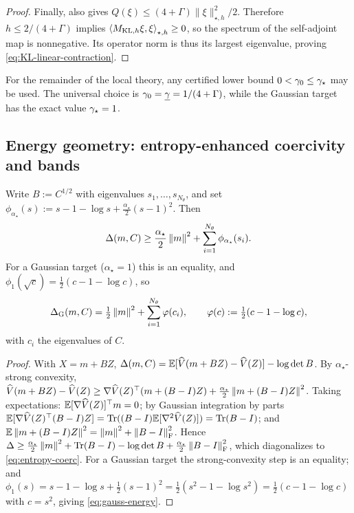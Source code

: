 \begin{proof}
Finally,  also gives
$Q(\xi)\leq(4+\Gamma)\|\xi\|_{\star,h}^2/2$.  Therefore
$h\leq2/(4+\Gamma)$ implies
$\left\langle M_{\mathrm{KL},h}\xi,\xi\right\rangle_{\star,h}\geq0$, so the spectrum of the self-adjoint map is
nonnegative.  Its operator norm is thus its largest eigenvalue, proving
\eqref{eq:KL-linear-contraction}.
\end{proof}

For the remainder of the local theory, any certified lower bound
$0<\gamma_0\leq\gamma_\star$ may be used.  The universal choice is
$\gamma_0=\underline{\gamma}=1/(4+\Gamma)$, while the Gaussian target has the exact value
$\gamma_\star=1$.

\subsection{Energy geometry: entropy-enhanced coercivity and bands}

\begin{lemma}
\label{lem:entropy-coerc}
Write $B:=C^{1/2}$ with eigenvalues $s_1,\dots,s_{N_\theta}$, and set
$\phi_{\alpha_\star}(s):=s-1-\log s+\tfrac{\alpha_\star}2(s-1)^2$. Then
\begin{equation}
\label{eq:entropy-coerc}
    \Delta(m,C)\geq\frac{\alpha_\star}2\left\lVert m\right\rVert^2+\sum_{i=1}^{N_\theta}\phi_{\alpha_\star}(s_i).
\end{equation}
For a Gaussian target ($\alpha_\star=1$) this is an equality, and
$\phi_1(\sqrt c)=\tfrac12(c-1-\log c)$, so
\begin{equation}
\label{eq:gauss-energy}
    \Delta_{\mathrm G}(m,C)=\tfrac12\left\lVert m\right\rVert^2+\sum_{i=1}^{N_\theta}\varphi(c_i),
    \qquad
    \varphi(c):=\tfrac12(c-1-\log c),
\end{equation}
with $c_i$ the eigenvalues of $C$.
\end{lemma}

\begin{proof}
With $X=m+BZ$, $\Delta(m,C)=\mathbb{E}[\widehat V(m+BZ)-\widehat V(Z)]-\log\det B$. By
$\alpha_\star$-strong convexity,
$\widehat V(m+BZ)-\widehat V(Z)\geq\nabla\widehat V(Z)^\top(m+(B-I)Z)+\tfrac{\alpha_\star}2\left\lVert m+(B-I)Z\right\rVert^2$.
Taking expectations: $\mathbb{E}[\nabla\widehat V(Z)]^\top m=0$; by Gaussian integration by parts
$\mathbb{E}[\nabla\widehat V(Z)^\top(B-I)Z]=\operatorname{Tr}((B-I)\mathbb{E}[\nabla^2\widehat V(Z)])=\operatorname{Tr}(B-I)$;
and $\mathbb{E}\left\lVert m+(B-I)Z\right\rVert^2=\left\lVert m\right\rVert^2+\left\lVert B-I\right\rVert_{\mathrm{F}}^2$. Hence
$\Delta\geq\tfrac{\alpha_\star}2\left\lVert m\right\rVert^2+\operatorname{Tr}(B-I)-\log\det B+\tfrac{\alpha_\star}2\left\lVert B-I\right\rVert_{\mathrm{F}}^2$,
which diagonalizes to \eqref{eq:entropy-coerc}. For a Gaussian target the strong-convexity
step is an equality; and
$\phi_1(s)=s-1-\log s+\tfrac12(s-1)^2=\tfrac12(s^2-1-\log s^2)=\tfrac12(c-1-\log c)$ with
$c=s^2$, giving \eqref{eq:gauss-energy}.
\end{proof}

